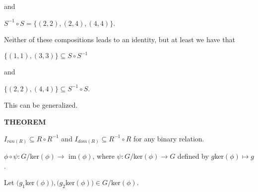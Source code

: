 \documentclass[12pt, a4paper]{article}
\begin{document}
\begin{flushleft}

and\par

\vspace{4mm}

\centerline{$S^{-1}\circ S=\{(2,2),(2,4),(4,4)\}$.}

\vspace{4mm}

Neither of these compositions leads to an identity, but at least we have that\par

\vspace{4mm}

\centerline{$\{(1,1),(3,3)\}\subseteq S\circ S^{-1}$}

\vspace{4mm}

and\par

\vspace{4mm}

\centerline{$\{(2,2),(4,4)\}\subseteq S^{-1}\circ S$.}

\vspace{4mm}

This can be generalized.


\end{flushleft}

\begin{flushleft}

\blacksquare \textbf{ THEOREM}

\end{flushleft}

$I_{ran(R)}\subseteq R\circ R^{-1}$ and $I_{dom(R)}\subseteq R^{-1}\circ R$ for any binary relation.










\newpage

$\phi\circ\psi\colon G/$ker$(\phi)\rightarrow$ im$(\phi)$, where $\psi\colon G/$ker$(\phi)\rightarrow G$ defined by $g$ker$(\phi)\mapsto g$. \par

\vspace{4mm}

Let $(g_1$ker$(\phi)),(g_2$ker$(\phi))\in G/$ker$(\phi)$.

\vspace{6mm}
\end{document}
